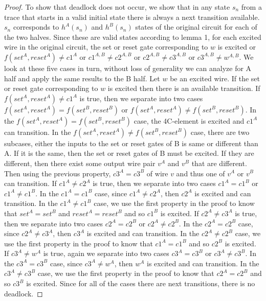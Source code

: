 \documentclass{article}
\begin{document}
\begin{proof}
To show that deadlock does not occur, we show that in any state $s_n$ from a trace that starts in a valid initial state there is always a next transition available.  $s_n$ corresponds to $h^A(s_n)$ and $h^B(s_n)$ states of the original circuit for each of the two halves.  Since these are valid states according to lemma 1, for each excited wire in the original circuit, the set or reset gate corresponding to $w$ is excited or $f(set^A, reset^A) \neq c1^A$ or $c1^{A,B}\neq c2^{A,B}$ or $c2^{A,B}\neq c3^{A,B}$ or $c3^{A,B} \neq w^{A,B}$.  We look at these five cases in turn, without loss of generality we can analyze for A half and apply the same results to the B half.  \newline
Let $w$ be an excited wire.  If the set or reset gate corresponding to $w$ is excited then there is an available transition.  \newline
If $f(set^A, reset^A) \neq c1^A$ is true, then we separate into two cases $f(set^A, reset^A)= f(set^B, reset^B)$ or $f(set^A, reset^A)\neq f(set^B, reset^B)$.  In the $f(set^A, reset^A)= f(set^B, reset^B)$ case, the 4C-element is excited and $c1^A$ can transition. In the $f(set^A, reset^A)\neq f(set^B, reset^B)$ case, there are two subcases, either the inputs to the set or reset gates of B is same or different than A.  If it is the same, then the set or reset gates of B must be excited.  If they are different, then there exist some output wire pair $v^A$ and $v^B$ that are different.  Then using the previous property, $c3^A=c3^B$ of wire $v$ and thus one of $v^A$ or $v^B$ can transition.\newline
If $c1^{A}\neq c2^{A}$ is true, then we separate into two cases $c1^A= c1^B$ or $c1^A\neq c1^B$.  In the $c1^A= c1^B$ case, since $c1^{A}\neq c2^{A}$, then $c2^A$ is excited and can transition. In the $c1^A\neq c1^B$ case, we use the first property in the proof to know that $set^A=set^B$ and $reset^A=reset^B$ and so $c1^B$ is excited. \newline
If $c2^{A}\neq c3^{A}$ is true, then we separate into two cases $c2^A= c2^B$ or $c2^A\neq c2^B$.  In the $c2^A= c2^B$ case, since $c2^{A}\neq c3^{A}$, then $c3^A$ is excited and can transition. In the $c2^A\neq c2^B$ case, we use the first property in the proof to know that $c1^A=c1^B$ and so $c2^B$ is excited.\newline
If $c3^{A}\neq w^{A}$ is true, again we separate into two cases $c3^A= c3^B$ or $c3^A\neq c3^B$.  In the $c3^A= c3^B$ case, since $c3^{A}\neq w^{A}$, then $w^A$ is excited and can transition. In the $c3^A\neq c3^B$ case, we use the first property in the proof to know that $c2^A=c2^B$ and so $c3^B$ is excited.\newline
Since for all of the cases there are next transitions, there is no deadlock.
\end{proof}
\end{document}

